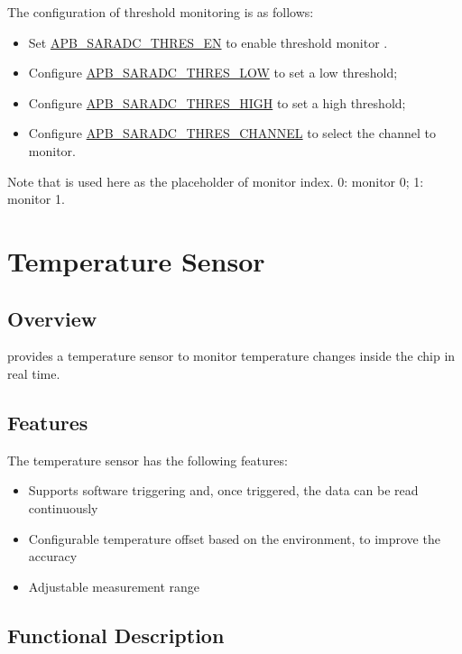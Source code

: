\documentclass[main\_\_EN.tex]{subfiles}
\begin{document}
The configuration of threshold monitoring is as follows:
\begin{itemize}
    \item Set \hyperref[fielddesc:APBSARADCAPBSARADCTHRES1EN]{APB\_SARADC\_THRES\_EN} to enable threshold monitor .
    \item Configure \hyperref[fielddesc:APBSARADCAPBSARADCTHRES1LOW]{APB\_SARADC\_THRES\_LOW} to set a low threshold;
    \item Configure \hyperref[fielddesc:APBSARADCAPBSARADCTHRES1LOW]{APB\_SARADC\_THRES\_HIGH} to set a high threshold;
    \item Configure \hyperref[fielddesc:APBSARADCAPBSARADCTHRES1LOW]{APB\_SARADC\_THRES\_CHANNEL} to select the channel to monitor.
\end{itemize}

Note that  is used here as the placeholder of monitor index. 0: monitor 0; 1: monitor 1.

\section{Temperature Sensor}\label{sec:sensor-temp-sensor}
\subsection{Overview}
\chipname{} provides a temperature sensor to monitor temperature changes inside the chip in real time.

\subsection{Features}
The temperature sensor has the following features:
\begin{itemize}
    \item Supports software triggering and, once triggered, the data can be read continuously
    \item Configurable temperature offset based on the environment, to improve the accuracy
    \item Adjustable measurement range
\end{itemize}


\subsection{Functional Description}
\end{document}

